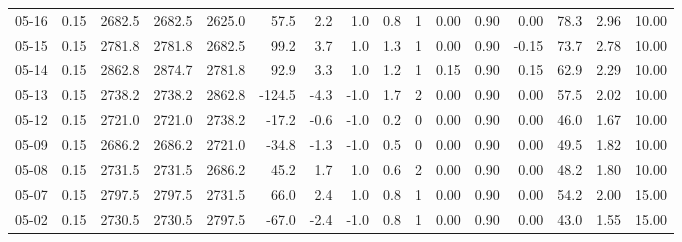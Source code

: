 \begin{threeparttable}
{\begin{tabular}{lrrrrrrrrrrrrrrr}
  05-16 &     0.15 & 2682.5 & 2682.5 & 2625.0 &       57.5 &            2.2 &                      1.0 &                 0.8 &              1 &       0.00 &      0.90 &           0.00 &             78.3 &            2.96 &                  10.00 \\
  05-15 &     0.15 & 2781.8 & 2781.8 & 2682.5 &       99.2 &            3.7 &                      1.0 &                 1.3 &              1 &       0.00 &      0.90 &          -0.15 &             73.7 &            2.78 &                  10.00 \\
  05-14 &     0.15 & 2862.8 & 2874.7 & 2781.8 &       92.9 &            3.3 &                      1.0 &                 1.2 &              1 &       0.15 &      0.90 &           0.15 &             62.9 &            2.29 &                  10.00 \\
  05-13 &     0.15 & 2738.2 & 2738.2 & 2862.8 &     -124.5 &           -4.3 &                     -1.0 &                 1.7 &              2 &       0.00 &      0.90 &           0.00 &             57.5 &            2.02 &                  10.00 \\
  05-12 &     0.15 & 2721.0 & 2721.0 & 2738.2 &      -17.2 &           -0.6 &                     -1.0 &                 0.2 &              0 &       0.00 &      0.90 &           0.00 &             46.0 &            1.67 &                  10.00 \\
  05-09 &     0.15 & 2686.2 & 2686.2 & 2721.0 &      -34.8 &           -1.3 &                     -1.0 &                 0.5 &              0 &       0.00 &      0.90 &           0.00 &             49.5 &            1.82 &                  10.00 \\
  05-08 &     0.15 & 2731.5 & 2731.5 & 2686.2 &       45.2 &            1.7 &                      1.0 &                 0.6 &              2 &       0.00 &      0.90 &           0.00 &             48.2 &            1.80 &                  10.00 \\
  05-07 &     0.15 & 2797.5 & 2797.5 & 2731.5 &       66.0 &            2.4 &                      1.0 &                 0.8 &              1 &       0.00 &      0.90 &           0.00 &             54.2 &            2.00 &                  15.00 \\
  05-02 &     0.15 & 2730.5 & 2730.5 & 2797.5 &      -67.0 &           -2.4 &                     -1.0 &                 0.8 &              1 &       0.00 &      0.90 &           0.00 &             43.0 &            1.55 &                  15.00 \\

\end{tabular}}
\end{threeparttable}

